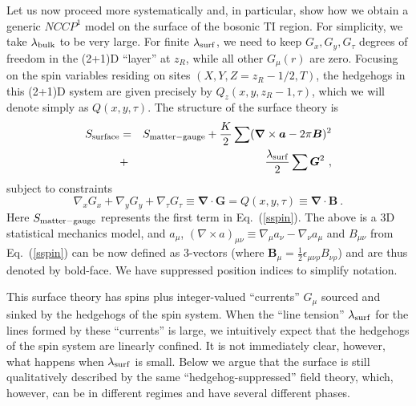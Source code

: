 \documentclass[prb,twocolumn]{revtex4-1}
\begin{document}
Let us now proceed more systematically and, in particular, show how we obtain a generic $NCCP^1$ model on the surface of the bosonic TI region.  For simplicity, we take $\lambda_{\rm bulk}$ to be very large. For finite $\lambda_{\rm surf}$, we need to keep $G_x, G_y, G_\tau$ degrees of freedom in the (2+1)D ``layer'' at $z_R$, while all other $G_\mu(r)$ are zero.  Focusing on the spin variables residing on sites $(X, Y, Z=z_R-1/2, T)$, the hedgehogs in this (2+1)D system are given precisely by $Q_z(x, y, z_R-1, \tau)$, which we will denote simply as $Q(x, y, \tau)$.  The structure of the surface theory is
\begin{eqnarray}
S_{\rm surface} &=& S_{\rm matter-gauge} + \frac{K}{2}\sum  ({\bm\nabla} \times {\bm a} - 2\pi {\bm B})^2\nonumber \\
&+& \frac{\lambda_{\rm surf}}{2}\sum  {\bm G}^2 ~,
\label{lesikeqn}
\end{eqnarray}
subject to constraints
\begin{equation}
 \nabla_x G_x + \nabla_y G_y + \nabla_\tau G_\tau \equiv {\bm \nabla} \cdot {\bm G} = Q(x,y,\tau) \equiv {\bm \nabla} \cdot {\bm B} ~.
\end{equation}
Here $S_{\rm matter-gauge}$ represents the first term in Eq.~(\ref{sspin}). The above is a 3D statistical mechanics model, and $a_\mu$, $(\nabla\times a)_{\mu\nu} \equiv \nabla_\mu a_\nu -\nabla_\nu a_\mu$ and $B_{\mu\nu}$ from Eq.~(\ref{sspin}) can be now defined as 3-vectors (where ${\bm B}_\mu=\frac{1}{2}\epsilon_{\mu\nu\rho}B_{\nu\rho}$) and are thus denoted by bold-face. We have suppressed position indices to simplify notation.

This surface theory has spins plus integer-valued ``currents'' $G_\mu$ sourced and sinked by the hedgehogs of the spin system.  When the ``line tension'' $\lambda_{\rm surf}$ for the lines formed by these ``currents'' is large, we intuitively expect that the hedgehogs of the spin system are linearly confined.  It is not immediately clear, however, what happens when $\lambda_{\rm surf}$ is small.  Below we argue that the surface is still qualitatively described by the same ``hedgehog-suppressed'' field theory, which, however, can be in different regimes and have several different phases.
\end{document}
